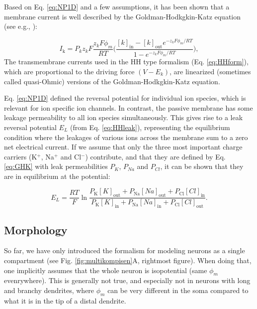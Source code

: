 Based on Eq. \ref{eq:NP1D} and a few assumptions, it has been shown that a membrane current is well described by the Goldman-Hodkgkin-Katz equation (see e.g., \cite{johnston1994foundations}):

\begin{equation}
I_\text{k} = P_k z_k F \frac{z_k F \phi_m}{R T} \Big( \frac{[k]_\text{in}-[k]_\text{out} e^{-z_k F \phi_m/RT}} {1-e^{-z_k F \phi_m/RT}} \Big), 
\label{eq:GHK}
\end{equation}
The transmembrane currents used in the HH type formalism (Eq. \ref{eq:HHform}), which are proportional to the driving force $(V-E_k)$, are linearized (sometimes called quasi-Ohmic) versions of the Goldman-Hodkgkin-Katz equation.

Eq. \ref{eq:NP1D} defined the reversal potential for individual ion species, which is relevant for ion specific ion channels. In contrast, the passive membrane has some leakage permeability to all ion species simultaneously. This gives rise to a leak reversal potential $E_L$ (from Eq. \ref{eq:HHleak}), representing the equilibrium condition where the leakages of various ions across the membrane sum to a zero net electrical current. If we assume that only the three most important charge carriers (K$^{+}$, Na$^{+}$ and Cl$^{-}$) contribute, and that they are defined by Eq. \ref{eq:GHK} with leak permeabilities $P_K$, $P_{Na}$ and $P_{Cl}$, it can be shown that they are in equilibrium at the potential:

\begin{equation}
E_L = \frac{R T}{F} 
\ln \frac{P_\text{K} [K]_\text{out}+P_\text{Na} [Na]_\text{out} + P_\text{Cl} [Cl]_\text{in}}
           {P_\text{K} [K]_\text{in}+P_\text{Na} [Na]_\text{in} + P_\text{Cl} [Cl]_\text{out}}.
\end{equation}


\subsection{Morphology}
So far, we have only introduced the formalism for modeling neurons as a single compartment (see Fig. \ref{fig:multikompisen}A, rightmost figure). When doing that, one implicitly assumes that the whole neuron is isopotential (same $\phi_m$ evenrywhere). This is generally not true, and especially not in neurons with long and branchy dendrites, where $\phi_m$ can be very different in the soma compared to what it is in the tip of a distal dendrite. 

